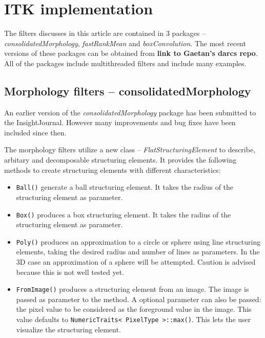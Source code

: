 \documentclass{InsightArticle}
\begin{document}
\section{ITK implementation}
The filters discusses in this article are contained in 3 packages --
{\em consolidatedMorphology}, {\em fastRankMean} and {\em
boxConvolution}. The most recent versions of these packages can be
obtained from {\bf link to Gaetan's darcs repo}. All of the packages
include multithreaded filters and include many examples.

\subsection{Morphology filters -- consolidatedMorphology}
An earlier version of the {\em consolidatedMorphology} package has
been submitted to the InsightJournal. However many improvements and
bug fixes have been included since then.

The morphology filters utilize a new class -- {\em
FlatStructuringElement} to describe, arbitary and decomposable
structuring elements. It provides the following methods to create
structuring elements with different characteristics:
\begin{itemize}
  \item \verb$Ball()$ generate a ball structuring element. It takes the 
	radius of the structuring element as parameter.
  \item \verb$Box()$ produces a box structuring element. It takes the radius 
	of the structuring element as parameter.
  \item \verb$Poly()$ produces an approximation to a circle or sphere using 
	line structuring elements, taking the desired radius and number of 
	lines as parameters. In the 3D case an approximation of a sphere will 
	be attempted. Caution is advised because this is not well tested yet.
  \item \verb$FromImage()$ produces a structuring element from an image. The image is passed
as parameter to the method. A optional parameter can also be passed: the pixel value
to be considered as the foreground value in the image. This value defaults to
\verb$NumericTraits< PixelType >::max()$. This lets the user visualize the structuring element.
\end{itemize}
\end{document}
